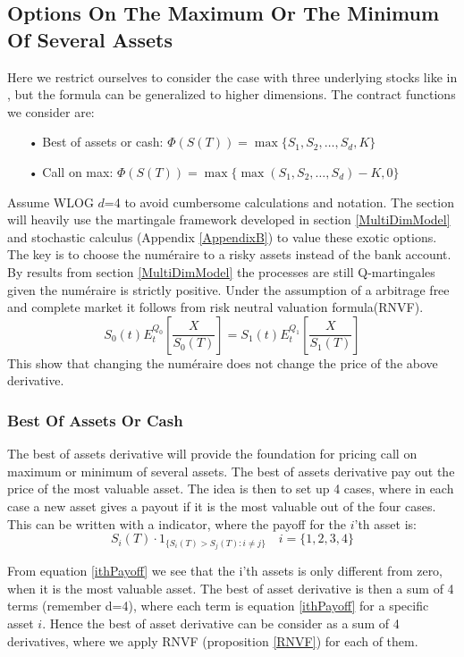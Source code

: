 \subsection{Options On The Maximum Or The Minimum Of Several Assets}
Here we restrict ourselves to consider the case with three underlying stocks like in \parencite{BEG, Ouwehand2006}, but the formula can be generalized to higher dimensions. The contract functions we consider are:
\begin{enumerate}
\item[•] Best of assets or cash: $\Phi(S(T))=\max\{S_1,S_2,\ldots,S_d,K\}$
\item[•] Call on max: $\Phi(S(T))=\max\{\max(S_1,S_2,\ldots,S_d)-K,0\}$
\end{enumerate}
Assume WLOG $d$=4 to avoid cumbersome calculations and notation. The section will heavily use the martingale framework developed in section \ref{MultiDimModel} and stochastic calculus (Appendix \ref{AppendixB}) to value these exotic options. The key is to choose the numéraire to a risky assets instead of the bank account. By results from section \ref{MultiDimModel} the processes are still Q-martingales given the numéraire is strictly positive. Under the assumption of a arbitrage free and complete market it follows from risk neutral valuation formula(RNVF).
$$S_0(t)E^{Q_0}_t[\frac{X}{S_0(T)}]=S_1(t)E^{Q_1}_t[\frac{X}{S_1(T)}]$$
This show that changing the numéraire does not change the price of the above derivative.

\subsubsection{Best Of Assets Or Cash}
The best of assets derivative will provide the foundation for pricing call on maximum or minimum of several assets. The best of assets derivative pay out the price of the most valuable asset. The idea is then to set up 4 cases, where in each case a new asset gives a payout if it is the most valuable out of the four cases. This can be written with a indicator, where the payoff for the $i$'th asset is:
\begin{equation}\label{ithPayoff}
S_i(T) \cdot 1_{\{S_i(T)>S_j(T): i\neq j\}} \quad i=\{1,2,3,4\}
\end{equation}

From equation \eqref{ithPayoff} we see that the i'th assets is only different from zero, when it is the most valuable asset. The best of asset derivative is then a sum of 4 terms (remember d=4), where each term is equation \eqref{ithPayoff} for a specific asset $i$. Hence the best of asset derivative can be consider as a sum of 4 derivatives, where we apply RNVF (proposition \ref{RNVF}) for each of them.\\

